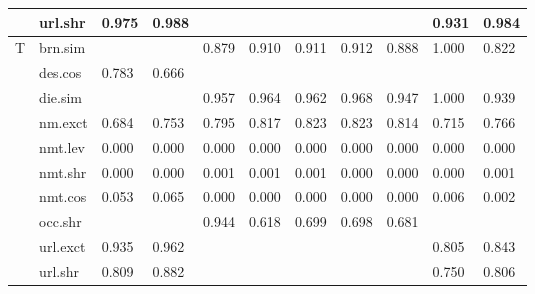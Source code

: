 \documentclass[epsfig,a4paper,11pt,titlepage,twoside,openany]{book}
\begin{document}
\begin{table}[H]
\begin{tabular}{ll|l|l|l|l|l|l|l|l|l|}
\multicolumn{1}{|l|}{}                                 & url.shr  & 0.975       & 0.988          &       &          &          &          &        & 0.931         & 0.984            \\ \hline \hline
\multicolumn{1}{|l|}{\multirow{10}{*}{T}}       & brn.sim  &             &                & 0.879 & 0.910    & 0.911    & 0.912    & 0.888  & 1.000         & 0.822            \\ \cline{2-11} 
\multicolumn{1}{|l|}{}                                 & des.cos  & 0.783       & 0.666          &       &          &          &          &        &               &                  \\ \cline{2-11} 
\multicolumn{1}{|l|}{}                                 & die.sim  &             &                & 0.957 & 0.964    & 0.962    & 0.968    & 0.947  & 1.000         & 0.939            \\ \cline{2-11} 
\multicolumn{1}{|l|}{}                                 & nm.exct  & 0.684       & 0.753          & 0.795 & 0.817    & 0.823    & 0.823    & 0.814  & 0.715         & 0.766            \\ \cline{2-11} 
\multicolumn{1}{|l|}{}                                 & nmt.lev  & 0.000       & 0.000          & 0.000 & 0.000    & 0.000    & 0.000    & 0.000  & 0.000         & 0.000            \\ \cline{2-11} 
\multicolumn{1}{|l|}{}                                 & nmt.shr  & 0.000       & 0.000          & 0.001 & 0.001    & 0.001    & 0.000    & 0.000  & 0.000         & 0.001            \\ \cline{2-11} 
\multicolumn{1}{|l|}{}                                 & nmt.cos  & 0.053       & 0.065          & 0.000 & 0.000    & 0.000    & 0.000    & 0.000  & 0.006         & 0.002            \\ \cline{2-11} 
\multicolumn{1}{|l|}{}                                 & occ.shr  &             &                & 0.944 & 0.618    & 0.699    & 0.698    & 0.681  &               &                  \\ \cline{2-11} 
\multicolumn{1}{|l|}{}                                 & url.exct & 0.935       & 0.962          &       &          &          &          &        & 0.805         & 0.843            \\ \cline{2-11} 
\multicolumn{1}{|l|}{}                                 & url.shr  & 0.809       & 0.882          &       &          &          &          &        & 0.750         & 0.806            \\ \hline \hline

\end{tabular}
\end{table}
\end{document}
